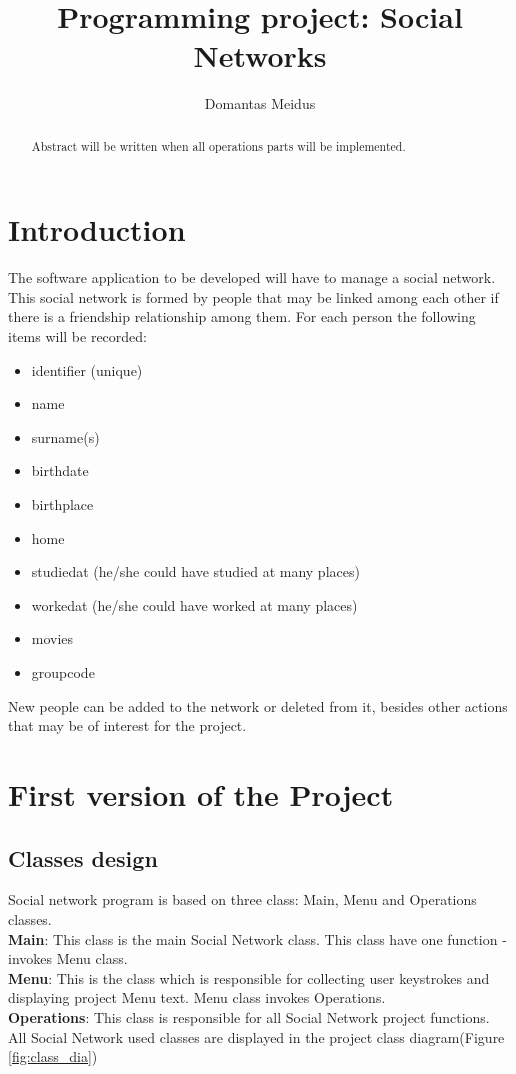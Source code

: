 \documentclass[a4paper]{article}
\title{Programming project: Social Networks}
\author{Domantas Meidus}
\begin{document}
\maketitle
\tableofcontents
\begin{abstract}
Abstract will be written when all operations parts will be implemented.
\end{abstract}
\section{Introduction}
The software application to be developed will have to manage a social network. This social
network is formed by people that may be linked among each other if there is a friendship
relationship among them. For each person the following items will be recorded:
\begin{itemize}
\item identifier (unique)
\item name
\item surname(s)
\item birthdate
\item birthplace
\item home
\item studiedat (he/she could have studied at many places)
\item workedat (he/she could have worked at many places)
\item movies
\item groupcode
\end{itemize}
New people can be added to the network or deleted from it, besides other actions that
may be of interest for the project.

\section{First version of the Project}

\subsection{Classes design}
Social network program is based on three class: Main, Menu and Operations classes.\\
\textbf{Main}: This class is the main Social Network class. This class have one function - invokes Menu class.\\
\textbf{Menu}: This is the class which is responsible for collecting user keystrokes and displaying project Menu text. Menu class invokes Operations.\\
\textbf{Operations}: This class is responsible for all Social Network project functions. 
All Social Network used classes are displayed in the project class diagram(Figure \ref{fig:class_dia})
\end{document}
